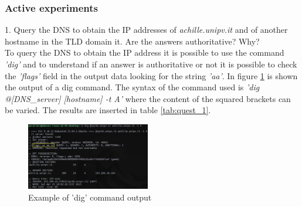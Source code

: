 \documentclass[a4paper,10pt]{article}
\begin{document}
\begin{multicols}{2}

\subsubsection*{Active experiments}

1. Query the DNS to obtain the IP addresses of \textit{achille.unipv.it} and of another hostname in the TLD domain it. Are the answers authoritative? Why?\\
To query the DNS to obtain the IP address it is possible to use the command \textit{'dig'} and to understand if an answer is authoritative or not it is possible to check 
the \textit{'flags'} field in the output data looking for the string \textit{'aa'}. In figure \ref{fig:dig_output} is shown the output of a dig command.
 The syntax of the command used is \textit{'dig @[DNS\_server] [hostname] -t A'} where 
the content of the squared brackets can be varied. The results are inserted in table \ref{tab:quest_1}.

        \begin{figure}[H]
                \centering
                \includegraphics[width=0.48\textwidth]{dig_screen.png}
                \caption{\small Example of 'dig' command output}
                \label{fig:dig_output}
        \end{figure}



\end{multicols}
\end{document}
